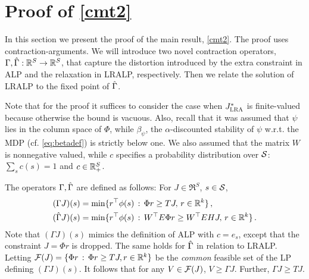 \section{Proof of \cref{cmt2}}\label{sec:improv}
In this section we present the proof of the main result, \cref{cmt2}. 
The proof uses contraction-arguments. 
\newcommand{\G}{\Gamma}
We will introduce two novel contraction operators, $\G,\hg: \Re^S \to \Re^S$, that capture the distortion introduced
by the extra constraint in ALP and the relaxation in LRALP, respectively. 
Then we relate the solution of LRALP to the fixed point of $\hg$.

Note that for the proof it suffices to consider the case when $\Jlro$ is finite-valued because otherwise the bound is vacuous.
Also, recall that it was assumed that $\psi$ lies in the column space of $\Phi$, while $\beta_\psi$, the $\alpha$-discounted stability of $\psi$ w.r.t. the MDP (cf. \eqref{eq:betadef}) is strictly below one. 
We also assumed that the matrix $W$ is nonnegative valued, while $c$ specifies a probability distribution over $\S$: $\sum_s c(s) = 1$ and $c\in \R_+^S$.

The operators $\G,\hg$ are defined as follows: For $J\in \Re^S$, $s\in \S$,
\begin{align*}
(\G J)(s) & = \min\{ r^\top \phi(s) \,:\, \Phi r \ge T J ,\, r\in \Re^k \}\,,\\
(\hg J)(s) & = \min\{ r^\top \phi(s) \,:\, W^\top E \Phi r \ge W^\top E H J ,\, r\in \Re^k\}\,.
\end{align*}
Note that $(\G J)(s)$ mimics the definition of ALP with $c = e_s$, except that the constraint $J = \Phi r$ is dropped.
The same holds for $\hg$ in relation to LRALP.
Letting $\F(J) = \{ \Phi r\,:\, \Phi r \ge T J, r\in \Re^k \}$ be the \emph{common} feasible set of the LP defining $(\G J)(s)$.
It follows that for any $V\in \F(J)$, $V \ge \Gamma J$. Further, $\Gamma J \ge T J$.

